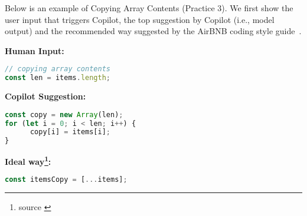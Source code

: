 Below is an example of Copying Array Contents (Practice 3). 
We first show the user input that triggers Copilot, the top suggestion by Copilot (i.e., model output) and the recommended way suggested by the AirBNB coding style guide~\cite{airbnb_code}.

\begin{tcolorbox}[title=Copying Array Contents,boxsep=.5mm]
\textbf{Human Input:}
\begin{lstlisting}[language=JavaScript]
// copying array contents
const len = items.length;
\end{lstlisting}
\tcbline
\textbf{Copilot Suggestion:}
\begin{lstlisting}[language=JavaScript]
const copy = new Array(len);
for (let i = 0; i < len; i++) {
	  copy[i] = items[i];
}
\end{lstlisting}
\tcbline
\textbf{Ideal way\footnote{source \cite{airbnb_code}}:}
\begin{lstlisting}[language=JavaScript]
const itemsCopy = [...items];
\end{lstlisting}
\end{tcolorbox}